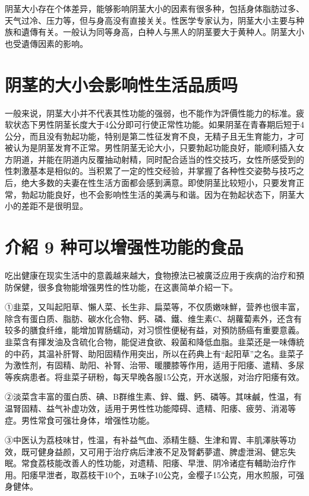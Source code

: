 \documentclass[12pt,UTF8]{ctexbook}
\begin{document}
阴茎大小存在个体差异，能够影响阴茎大小的因素有很多种，包括身体脂肪过多、天气过冷、压力等，但与身高没有直接关关。性医学专家认为，阴茎大小主要与种族和遺傳有关。一般认为同等身高，白种人与黑人的阴茎要大于黄种人。阴茎大小也受遺傳因素的影响。

\section{阴茎的大小会影响性生活品质吗}

一般来说，阴茎大小并不代表其性功能的强弱，也不能作为評價性能力的标准。疲软状态下男性阴茎长度大于4公分即可行使正常性功能。如果阴茎在青春期后短于4公分，而且没有勃起功能，特别是第二性征发育不良，无精子且无生育能力，才可被认为是阴茎发育不正常。男性阴茎无论大小，只要勃起功能良好，能顺利插入女方阴道，并能在阴道内反覆抽动射精，同时配合适当的性交技巧，女性所感受到的性刺激基本是相似的。当积累了一定的性交经验，并掌握了各种性交姿勢与技巧之后，绝大多数的夫妻在性生活方面都会感到满意。即使阴茎比较短小，只要发育正常，勃起功能良好，也不会影响性生活的美满与和谐。因为在勃起状态下，阴茎大小的差距不是很明显。

\section{介紹 9 种可以增强性功能的食品}

吃出健康在现实生活中的意義越来越大，食物撩法已被廣泛应用于疾病的治疗和預防保健，很多食物能增强男性的性功能，在这裹简单介紹一下。

①韭菜，又叫起阳草、懶人菜、长生非、扁菜等，不仅质嫩味鮮，营养也很丰富，除含有蛋白质、脂肪、碳水化合物、鈣、磷、鐵、维生素C、胡蘿蔔素外，还含有较多的膳食纤维，能增加胃肠蠕动，对习惯性便秘有益，对預防肠癌有重要意義。韭菜含有揮发油及含硫化合物，能促进食欲、殺菌和降低血脂。韭菜还是一味傳統的中药，其温补肝腎、助阳固精作用突出，所以在药典上有“起阳草”之名。韭菜子为激性剂，有固精、助阳、补腎、治带、暖腰膝等作用，适用于阳痿、遣精、多尿等疾病患者。将韭菜子研粉，每天早晚各服15公克，开水送服，对治疗阳痿有效。

②淡菜含丰富的蛋白质、碘、B群维生素、鋅、鐵、鈣、磷等。其味鹹，性温，有温腎固精、益气补虚功效，适用于男性性功能障碍、遗精、阳痿、疲劳、消渴等症。男性常食可强壮身体，增强性功能。

③中医认为荔枝味甘，性温，有补益气血、添精生髓、生津和胃、丰肌澤肤等功效，既可健身益颜，又可用于治疗病后津液不足及腎虧夢遣、脾虚泄潟、健忘失眠。常食荔枝能改善人的性功能，对遗精、阳痿、早泄、阴冷诸症有輔助治疗作用。阳痿早泄者，取荔枝干10个，五味子10公克，金樱子15公克，用水煎服，可强身健体。
\end{document}
